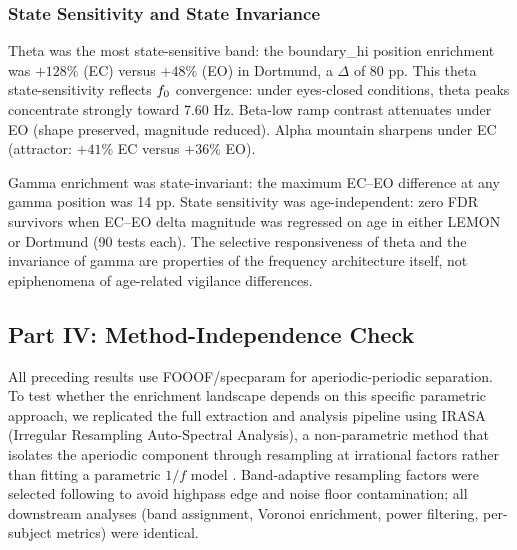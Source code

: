 \subsubsection{State Sensitivity and State Invariance}
\label{sec:state}

Theta was the most state-sensitive band: the boundary\_hi position enrichment was $+128\%$ (EC) versus $+48\%$ (EO) in Dortmund, a $\Delta$ of 80 pp. This theta state-sensitivity reflects $f_0$ convergence: under eyes-closed conditions, theta peaks concentrate strongly toward 7.60 Hz. Beta-low ramp contrast attenuates under EO (shape preserved, magnitude reduced). Alpha mountain sharpens under EC (attractor: $+41\%$ EC versus $+36\%$ EO).

Gamma enrichment was state-invariant: the maximum EC--EO difference at any gamma position was 14 pp. State sensitivity was age-independent: zero FDR survivors when EC--EO delta magnitude was regressed on age in either LEMON or Dortmund (90 tests each). The selective responsiveness of theta and the invariance of gamma are properties of the frequency architecture itself, not epiphenomena of age-related vigilance differences.

\subsection{Part IV: Method-Independence Check}
\label{sec:irasa}

All preceding results use FOOOF/specparam for aperiodic-periodic separation. To test whether the enrichment landscape depends on this specific parametric approach, we replicated the full extraction and analysis pipeline using IRASA (Irregular Resampling Auto-Spectral Analysis), a non-parametric method that isolates the aperiodic component through resampling at irrational factors rather than fitting a parametric $1/f$ model \parencite{wen2016irasa}. Band-adaptive resampling factors were selected following \textcite{gerster2022irasa} to avoid highpass edge and noise floor contamination; all downstream analyses (band assignment, Voronoi enrichment, power filtering, per-subject metrics) were identical.

